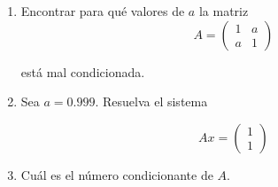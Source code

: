 
\begin{enumerate}[label=(\alph*)]
\item Encontrar para qué valores de $a$ la matriz
$$A = \begin{pmatrix}
                1 & a \\ 
                a & 1
            \end{pmatrix}$$
    
    está mal condicionada.
  \item Sea $a=0.999$. Resuelva el sistema
    
    $$Ax=\begin{pmatrix}
                1\\ 
                1
            \end{pmatrix}$$
\item Cuál es el número condicionante de $A$.
  \end{enumerate}
  
